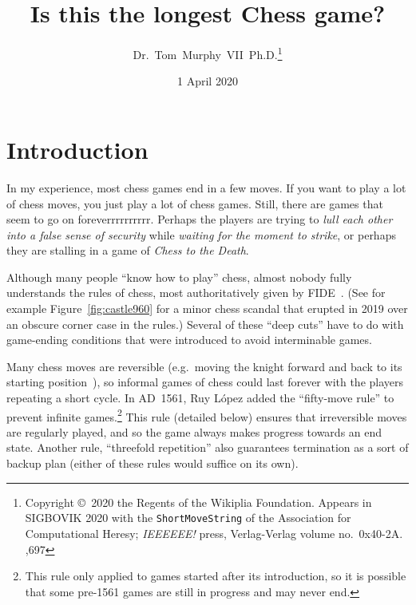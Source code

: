 \documentclass[twocolumn]{article}
\begin{document}
 

\title{Is this the longest Chess game?}
\author{Dr.~Tom~Murphy~VII~Ph.D.\thanks{
Copyright \copyright\ 2020 the Regents of the Wikiplia
Foundation. Appears in SIGBOVIK 2020 with the {\tt ShortMoveString} of the
Association for Computational Heresy; {\em IEEEEEE!} press,
Verlag-Verlag volume no.~0x40-2A.
,697
}
}

\renewcommand\>{$>$}
\newcommand\<{$<$}

\date{1 April 2020}

\maketitle

\section{Introduction}

In my experience, most chess games end in a few moves. If you want to
play a lot of chess moves, you just play a lot of chess games. Still,
there are games that seem to go on foreverrrrrrrrrr. Perhaps the
players are trying to {\em lull each other into a false sense of
security} while {\em waiting for the moment to strike}, or perhaps they
are stalling in a game of {\em Chess to the Death}.

Although many people ``know how to play'' chess, almost nobody fully
understands the rules of chess, most authoritatively given by
FIDE~\cite{fiderules}. (See for example Figure~\ref{fig:castle960} for
a minor chess scandal that erupted in 2019 over an obscure corner case
in the rules.) Several of these ``deep cuts'' have to do with
game-ending conditions that were introduced to avoid interminable
games.

Many chess moves are reversible (e.g.~moving the knight forward and
back to its starting position~\cite{survival}), so informal games of
chess could last forever with the players repeating a short cycle. In
AD~1561, Ruy L\'opez added the ``fifty-move rule'' to prevent infinite
games.\footnote{This rule only applied to games started after its
  introduction, so it is possible that some pre-1561 games are still
  in progress and may never end.} This rule (detailed below) ensures
that irreversible moves are regularly played, and so the game always
makes progress towards an end state. Another rule, ``threefold
repetition'' also guarantees termination as a sort of backup plan
(either of these rules would suffice on its own).
\end{document}
